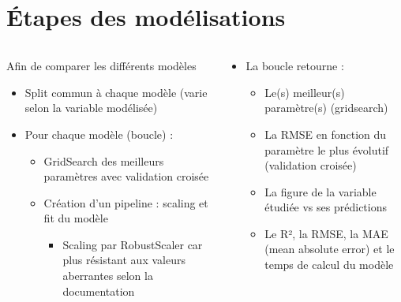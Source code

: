 \documentclass[8pt,aspectratio=169,hyperref={unicode=true}]{beamer}
\begin{document}
\section{Étapes des modélisations}
\begin{frame}{\insertsection}
  \begin{columns}
    \begin{column}{.5\textwidth}
      Afin de comparer les différents modèles
      \begin{itemize}
        \item Split commun à chaque modèle (varie selon la variable modélisée)
        \item Pour chaque modèle (boucle) :
              \begin{itemize}
                \item GridSearch des meilleurs paramètres avec validation croisée
                \item Création d'un pipeline : scaling et fit du modèle
                      \begin{itemize}
                        \item Scaling par RobustScaler car plus résistant aux valeurs aberrantes
                              selon la documentation
                      \end{itemize}
              \end{itemize}
      \end{itemize}
    \end{column}
    \begin{column}{.5\textwidth}
      \begin{itemize}
        \item La boucle retourne :
              \begin{itemize}
                \item Le(s) meilleur(s) paramètre(s) (gridsearch)
                \item La RMSE en fonction du paramètre le plus évolutif (validation croisée)
                \item La figure de la variable étudiée vs ses prédictions
                \item Le R², la RMSE, la MAE (mean absolute error) et le temps de calcul du modèle
              \end{itemize}
      \end{itemize}
    \end{column}
  \end{columns}
  \vspace{.5cm}

\end{frame}
\end{document}
